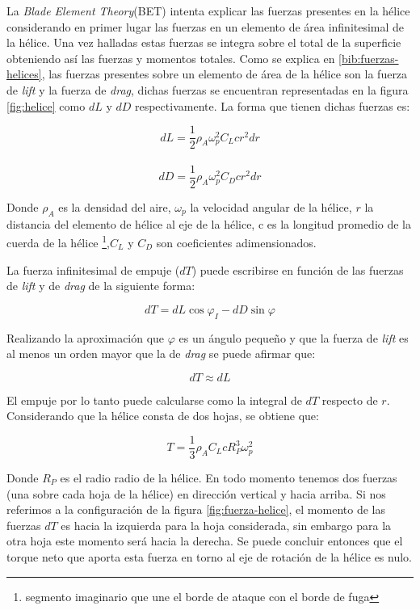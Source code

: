 \documentclass[main]{subfiles}
\begin{document}
La \emph{Blade Element Theory}(BET) intenta explicar las fuerzas presentes en la h\'elice considerando en primer lugar las fuerzas en un elemento de \'area infinitesimal de la h\'elice. Una vez halladas estas fuerzas se integra sobre el total de la superficie obteniendo as\'i las fuerzas y momentos totales. Como se explica en \ref{bib:fuerzas-helices}, las fuerzas presentes sobre un elemento de \'area de la h\'elice son la fuerza de \emph{lift} y la fuerza de \emph{drag}, dichas fuerzas se encuentran representadas en la figura \ref{fig:helice} como $dL$ y $dD$ respectivamente. La forma que tienen dichas fuerzas es:

$$
dL=\frac{1}{2}\rho_A \omega_p^2 C_L c r^2dr$$\\

$$
dD=\frac{1}{2}\rho_A \omega_p^2 C_D c r^2dr
$$

Donde $\rho_A$ es la densidad del aire, $\omega_p$ la velocidad angular de la h\'elice, $r$ la distancia del elemento de h\'elice al eje de la h\'elice, c es la longitud promedio de la cuerda de la h\'elice \footnote{segmento imaginario que une el borde de ataque con el borde de fuga },$ C_L$ y $C_D$ son coeficientes adimensionados.

La fuerza infinitesimal de empuje ($dT$) puede escribirse en funci\'on de las fuerzas de \emph{lift} y de \emph{drag} de la siguiente forma:

$$dT=dL\cos\varphi_I-dD\sin\varphi$$

Realizando la aproximaci\'on que $\varphi$ es un \'angulo peque\~no y que la fuerza de \emph{lift} es al menos un orden mayor que la de \emph{drag} se puede afirmar que:

$$dT\approx dL
$$

El empuje por lo tanto puede calcularse como la integral de $dT$ respecto de $r$. Considerando que la h\'elice consta de dos hojas, se obtiene que:

\begin{equation}
\label{eq:fuerza}
T=\frac{1}{3}\rho_A C_L c R_P^3\omega_p^2
\end{equation}


Donde $R_P$ es el radio radio de la h\'elice. En todo momento tenemos dos fuerzas (una sobre cada hoja de la h\'elice) en direcci\'on vertical y hacia arriba. Si nos referimos a la configuraci\'on de la figura \ref{fig:fuerza-helice}, el momento de las fuerzas $dT$ es hacia la izquierda para la hoja considerada, sin embargo para la otra hoja este momento ser\'a hacia la derecha. Se puede concluir entonces que el torque neto que aporta esta fuerza en torno al eje de rotaci\'on de la h\'elice es nulo.\\   
\end{document}

